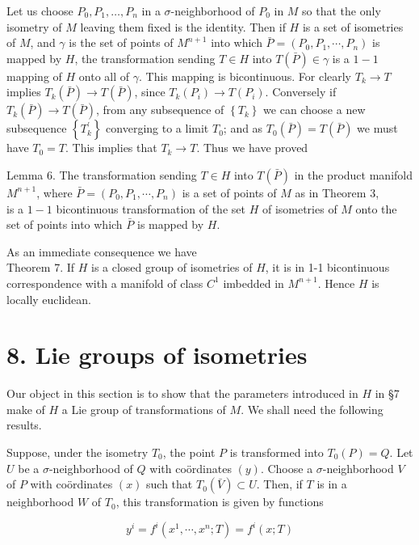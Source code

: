 \documentclass[10pt]{article}
\begin{document}
Let us choose $P_{0}, P_{1}, \ldots, P_{n}$ in a $\sigma$-neighborhood of $P_{0}$ in $M$ so that the only isometry of $M$ leaving them fixed is the identity. Then if $H$ is a set of isometries of $M$, and $\gamma$ is the set of points of $M^{n+1}$ into which $\bar{P}=\left(P_{0}, P_{1}, \cdots, P_{n}\right)$ is mapped by $H$, the transformation sending $T \in H$ into $T(\bar{P}) \in \gamma$ is a $1-1$ mapping of $H$ onto all of $\gamma$. This mapping is bicontinuous. For clearly $T_{k} \rightarrow T$ implies $T_{k}(\bar{P}) \rightarrow T(\bar{P})$, since $T_{k}\left(P_{i}\right) \rightarrow T\left(P_{i}\right)$. Conversely if $T_{k}(\bar{P}) \rightarrow T(\bar{P})$, from any subsequence of $\left\{T_{k}\right\}$ we can choose a new subsequence $\left\{T_{k}^{\prime}\right\}$ converging to a limit $T_{0}$; and as $T_{0}(\bar{P})=T(\bar{P})$ we must have $T_{0}=T$. This implies that $T_{k} \rightarrow T$. Thus we have proved

Lemma 6. The transformation sending $T \in H$ into $T(\bar{P})$ in the product manifold $M^{n+1}$, where $\bar{P}=\left(P_{0}, P_{1}, \cdots, P_{n}\right)$ is a set of points of $M$ as in Theorem 3,\\
is a $1-1$ bicontinuous transformation of the set $H$ of isometries of $M$ onto the set of points into which $\bar{P}$ is mapped by $H$.

As an immediate consequence we have\\
Theorem 7. If $H$ is a closed group of isometries of $H$, it is in 1-1 bicontinuous correspondence with a manifold of class $C^{1}$ imbedded in $M^{n+1}$. Hence $H$ is locally euclidean.

\section*{8. Lie groups of isometries}
Our object in this section is to show that the parameters introduced in $H$ in §7 make of $H$ a Lie group of transformations of $M$. We shall need the following results.

Suppose, under the isometry $T_{0}$, the point $P$ is transformed into $T_{0}(P)=Q$. Let $U$ be a $\sigma$-neighborhood of $Q$ with coördinates $(y)$. Choose a $\sigma$-neighborhood $V$ of $P$ with coördinates $(x)$ such that $T_{0}(\bar{V}) \subset U$. Then, if $T$ is in a neighborhood $W$ of $T_{0}$, this transformation is given by functions


\begin{equation*}
y^{i}=f^{i}\left(x^{1}, \cdots, x^{n} ; T\right)=f^{i}(x ; T) \tag{8.1}
\end{equation*}
\end{document}
